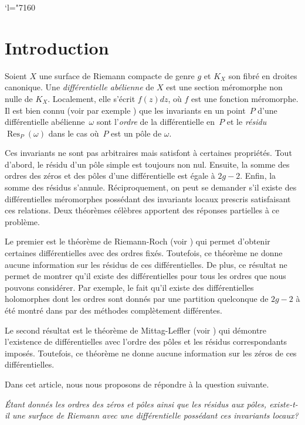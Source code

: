 \documentclass[11pt]{article}
\numberwithin{equation}{section}\renewcommand{\proofname}{Démonstration}
\newcommand{\Changel}{\mathcode`l="7160}
\newcommand\Res{\operatorname{Res}}
\theoremstyle{definition}
\begin{document}
\Changel

\section{Introduction}

Soient $X$ une surface de Riemann compacte de genre $g$ et $K_{X}$ son fibré en droites canonique. Une \emph{différentielle abélienne} de $X$ est une section méromorphe non nulle de $K_{X}$. Localement, elle s'écrit $f(z)dz$, où $f$ est une fonction méromorphe.
Il est bien connu (voir par exemple \cite[Encadré\,III.2]{dSG}) que les invariants en un point~$P$ d'une différentielle abélienne~$\omega$ sont l'\emph{ordre} de la différentielle en~$P$ et le \emph{résidu $\Res_{P}(\omega)$} dans le cas où~$P$ est un pôle de $\omega$.

Ces invariants ne sont pas arbitraires mais satisfont à certaines propriétés. Tout d'abord, le résidu d'un pôle simple est toujours non nul. Ensuite, la somme des ordres des zéros et des pôles d'une différentielle est égale à $2g-2$. Enfin, la somme des résidus s'annule. Réciproquement, on peut se demander s'il existe des différentielles méromorphes possédant des invariants locaux prescris satisfaisant ces relations.
Deux théorèmes célèbres apportent des réponses partielles à ce problème.
\par
Le premier est le théorème de Riemann-Roch (voir \cite[Th.\,9.3]{reyssat}) qui permet d'obtenir certaines différentielles avec des ordres fixés. Toutefois, ce théorème ne donne aucune information sur les résidus de ces différentielles. De plus, ce résultat ne permet de montrer qu'il existe des différentielles pour tous les ordres que nous pouvons considérer. Par exemple, le fait qu'il existe des différentielles holomorphes dont les ordres sont donnés par une partition quelconque de $2g-2$ à été montré dans \cite{masm} par des méthodes complètement différentes.
\par
Le second résultat est le théorème de Mittag-Leffler (voir \cite[Prop.\,9.3]{reyssat}) qui démontre l'existence de différentielles avec l'ordre des pôles et les résidus correspondants imposés. Toutefois, ce théorème ne donne aucune information sur les zéros de ces différentielles.

Dans cet article, nous nous proposons de répondre à la question suivante.
\par\smallskip
\emph{Étant donnés les ordres des zéros et pôles ainsi que les résidus aux pôles, existe-t-il une surface de Riemann avec une différentielle possédant ces invariants locaux?}
\end{document}
